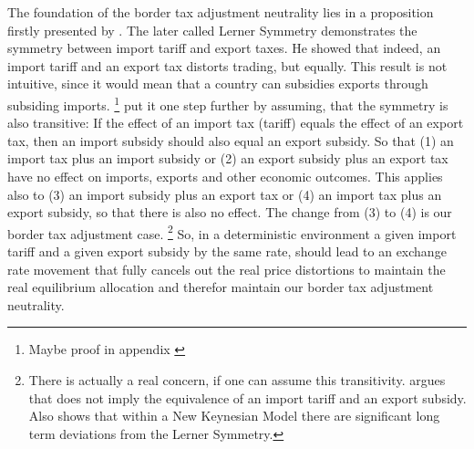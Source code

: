 The foundation of the border tax adjustment neutrality lies in a proposition firstly presented by \cite{lerner1936symmetry}. The later called Lerner Symmetry demonstrates the symmetry between import tariff and export taxes. He showed that indeed, an import tariff and an export tax distorts trading, but equally. This result is not intuitive, since it would mean that a country can subsidies exports through subsiding imports. \footnote{Maybe proof in appendix \cite{bhagwati1998lectures}}   \cite{grossman1980border} put it one step further by assuming, that the symmetry is also transitive: If the effect of an import tax (tariff) equals the effect of an export tax, then an import subsidy should also equal an export subsidy. So that (1) an import tax plus an import subsidy or (2) an export subsidy plus an export tax have no effect on imports, exports and other economic outcomes. This applies also to (3) an import subsidy plus an export tax or (4) an import tax plus an export subsidy, so that there is also no effect. The change from (3) to (4) is our border tax adjustment case.  \footnote{There is actually a real concern, if one can assume this transitivity. \cite{casas1991lerner} argues that \cite{lerner1936symmetry} does not imply the equivalence of an import tariff and an export subsidy. Also \cite{linde2017macroeconomic} shows that within a New Keynesian Model there are significant long term deviations from the Lerner Symmetry.}
So, in a deterministic environment a given import tariff and a given export subsidy by the same rate, should lead to an exchange rate movement that fully cancels out the real price distortions to maintain the real equilibrium allocation and therefor maintain our border tax adjustment neutrality. \\

